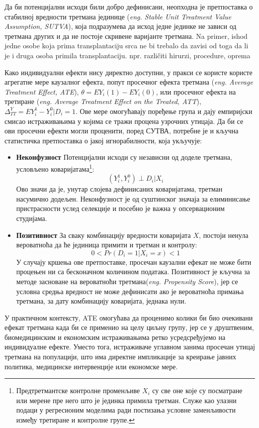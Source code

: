 \documentclass[12pt, a4paper]{article}
\begin{document}
Да би потенцијални исходи били добро дефинисани, неопходна је претпоставка о стабилној вредности третмана јединице (\textit{eng. Stable Unit Treatment Value Assumption, SUTVA}), 
која подразумева да исход једне јединке не зависи од третмана других и да не постоје скривене варијанте третмана. 
Na primer, ishod jedne osobe koja prima transplantaciju srca ne bi trebalo da zavisi od toga da li je i druga osoba primila transplantaciju.
npr. različiti hirurzi, procedure, oprema

Како индивидуални ефекти нису директно доступни, у пракси се користе користе агрегатне мере каузалног ефекта, попут просечног ефекта третмана 
(\textit{eng. Average Treatment Effect, ATE}), $\theta = E{Y_i(1)} - E{Y_i(0)}$, или просечног ефекта на третиране (\textit{eng. Average Treatment Effect on the Treated, ATT}), 
$\Delta^Y_{TT} = E{Y_i^1 - Y_i^0 | D_i=1}$. Ове мере омогућавају поређење група и дају емпиријски смисао истраживањима у којима се тражи процена узрочних утицаја. Да би 
се ови просечни ефекти могли проценити, поред СУТВА, потребне је и кључна статистичка претпоставка о јакој игнорабилности, која укључује:
\begin{itemize}
    \item \textbf{Неконфузност} Потенцијални исходи су независни од доделе третмана, условљено коваријатама\footnote{Предтретмантске контролне променљиве $X_i$ су све оне које су посматране или мерене 
пре него што је јединка примила третман. Служе као улазни подаци у регресионим моделима ради постизања условне заменљивости између третиране и контролне групе.}:
$$
(Y^1_i, Y^0_i) \perp D_i | X_i
$$
Ово значи да је, унутар слојева дефинисаних коваријатама, третман насумично додељен. Неконфузност је од суштинског значаја за елиминисање пристрасности услед селекције и посебно 
је важна у опсервационим студијама.
    \item \textbf{Позитивност} За сваку комбинацију вредности коваријата $X$, постоји ненула вероватноћа да ће јединица примити и третман и контролу:
$$
0 < Pr(D_i=1|X_i=x) < 1
$$
У случају кршења ове претпоставке, просечан каузални ефекат не може бити процењен ни са бесконачном количином података. Позитивност је кључна за методе засноване на 
вероватноћи третмана(\textit{eng. Propensity Score}), јер се условна средња вредност не може дефинисати ако је вероватноћа примања третмана, за дату комбинацију коваријата, једнака нули.
\end{itemize}

У практичном контексту, ATE омогућава да проценимо колики би био очекивани ефекат третмана када би се применио 
на целу циљну групу, јер се у друштвеним, биомедицинским и економским истраживањима ретко усредсређујемо на индивидуалне ефекте. 
Уместо тога, истраживаче углавном занима просечан утицај третмана на популацији, што има директне импликације за 
креирање јавних политика, медицинске интервенције или економске мере.
\end{document}
